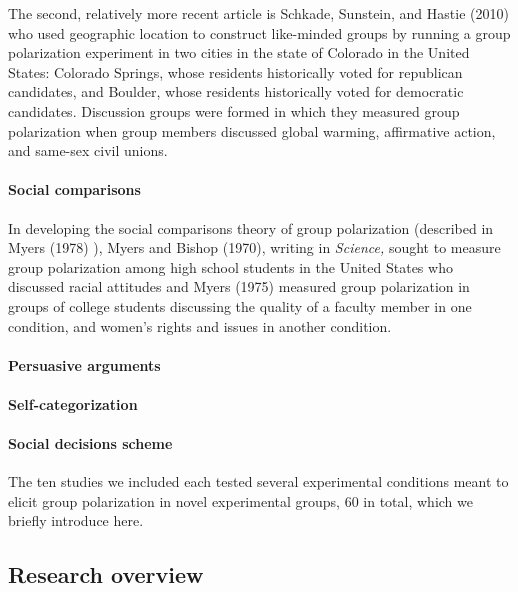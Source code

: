 \documentclass[
  abstract]{article}
\let\oldparagraph\paragraph
\renewcommand{\paragraph}[1]{\oldparagraph{#1}\mbox{}}
\begin{document}
The second, relatively more recent article is Schkade, Sunstein, and
Hastie (2010) \autocite{Schkade2010} who used geographic location to
construct like-minded groups by running a group polarization experiment
in two cities in the state of Colorado in the United States: Colorado
Springs, whose residents historically voted for republican candidates,
and Boulder, whose residents historically voted for democratic
candidates. Discussion groups were formed in which they measured group
polarization when group members discussed global warming, affirmative
action, and same-sex civil unions.

\paragraph{Social comparisons}

In developing the social comparisons theory of group polarization
(described in Myers (1978) \autocite{Myers1978}), Myers and Bishop
(1970), writing in \emph{Science,} \autocite{Myers1970} sought to
measure group polarization among high school students in the United
States who discussed racial attitudes and Myers (1975)
\autocite{Myers1975} measured group polarization in groups of college
students discussing the quality of a faculty member in one condition,
and women's rights and issues in another condition.

\paragraph{Persuasive arguments}

\paragraph{Self-categorization}

\paragraph{Social decisions scheme}

The ten studies we included each tested several experimental conditions
meant to elicit group polarization in novel experimental groups, 60 in
total, which we briefly introduce here.\\

\subsection{Research overview}\label{research-overview}
\end{document}

